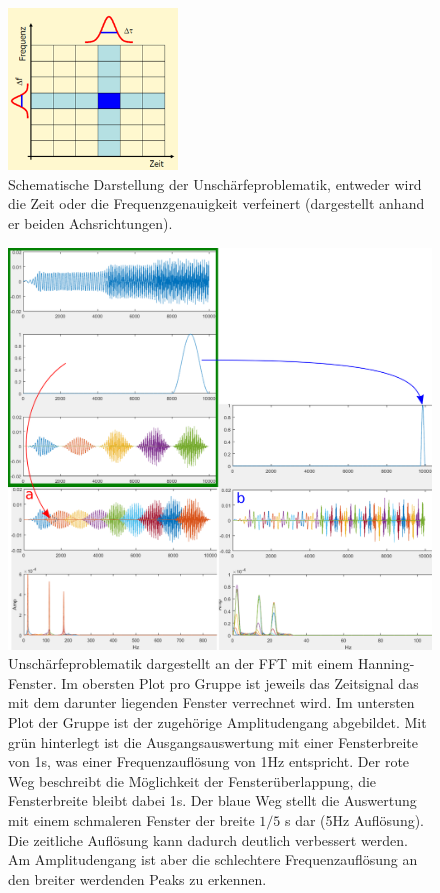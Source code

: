 \begin{figure}
	\centering
	\includegraphics[width=0.4\textwidth]{papers/wavelets/images/6-1_FFTAufloesung.png}
	\caption{\cite{wavelets:J.Mayer.2002} Schematische Darstellung der Unschärfeproblematik, entweder wird die Zeit oder die Frequenzgenauigkeit verfeinert (dargestellt anhand er beiden Achsrichtungen).}
	\label{wavelet:fig:FFTAufloesung}
\end{figure}

\begin{figure}
	\centering
	\includegraphics[width=\textwidth]{papers/wavelets/images/6-2_AufloesungZeitVsFrequenz.png}
	\caption{Unschärfeproblematik dargestellt an der FFT mit einem Hanning-Fenster. Im obersten Plot pro Gruppe ist jeweils das Zeitsignal das mit dem darunter liegenden Fenster verrechnet wird. Im untersten Plot der Gruppe ist der zugehörige Amplitudengang abgebildet. Mit grün hinterlegt ist die Ausgangsauswertung mit einer Fensterbreite von 1s, was einer Frequenzauflösung von 1Hz entspricht. Der rote Weg beschreibt die Möglichkeit der Fensterüberlappung, die Fensterbreite bleibt dabei 1s. Der blaue Weg stellt die Auswertung mit einem schmaleren Fenster der breite $1/5$ s dar (5Hz Auflösung). Die zeitliche Auflösung kann dadurch deutlich verbessert werden. Am Amplitudengang ist aber die schlechtere Frequenzauflösung an den breiter werdenden Peaks zu erkennen.}
	\label{wavelet:fig:AufloesungZeitVsFrequenz}
\end{figure}

